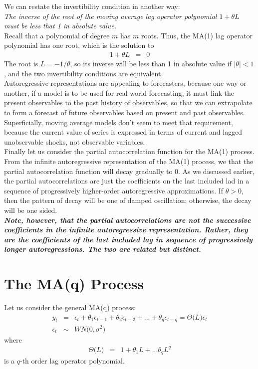 We can restate the invertibility condition in another way:\\
\textit{The inverse of the root of the moving average lag operator polynomial $1 + \theta L$ must be less that 1 in absolute value.}\\
Recall that a polynomial of degree $m$ has $m$ roots. Thus, the MA(1) lag operator polynomial has one root, which is the solution to
\begin{eqnarray}
	1 +\theta L  &=& 0
\end{eqnarray}
The root is $L = -1/\theta$, so its inverse will be less than 1 in absolute value if $\vert\theta\vert < 1$, and the two invertibility conditions are equivalent.\\
Autoregressive representations are appealing to forecasters, because one way or another, if a model is to be used for real-world forecasting, it must link the present observables to the past history of observables, so that we can extrapolate to form a forecast of future observables based on present and past observables. Superficially, moving average models don't seem to meet that requirement, because the current value of series is expressed in terms of current and lagged unobservable shocks, not observable variables.\\
Finally let us consider the partial autocorrelation function for the MA(1) process. From the infinite autoregressive representation of the MA(1) process, we that the partial autocorrelation function will decay gradually to 0. As we discussed earlier, the partial autocorrelations are just the coefficients on the last included lad in a sequence of progressively higher-order autoregressive approximations. If $\theta > 0$, then the pattern of decay will be one of damped oscillation; otherwise, the decay will be one sided.\\
\textit{\textbf{\color{blue}Note, however, that the partial autocorrelations are not the successive coefficients in the infinite autoregressive representation. Rather, they are the coefficients of the last included lag in sequence of progressively longer autoregressions. The two are related but distinct.
}}

\section{The MA(q) Process}
Let us consider the general MA(q) process:
\begin{eqnarray}
	y_{t} &=& \epsilon_{t} + \theta_{1}\epsilon_{t - 1} + \theta_{2}\epsilon_{t - 2} + ... + \theta_{q}\epsilon_{t - q} = \Theta\big(L\big)\epsilon_{t}\\
	\epsilon_{t} &\sim& WN\Big(0, \sigma^{2}\Big)
\end{eqnarray}
where
\begin{eqnarray}
\Theta\big(L\big) &=& 1 + \theta_{1}L + ... \theta_{q}L^{q}
\end{eqnarray}
is a $q$-th order lag operator polynomial.

